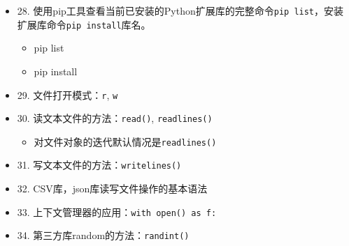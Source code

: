 \documentclass[11pt]{article}
\providecommand{\tightlist}{%
      \setlength{\itemsep}{0pt}\setlength{\parskip}{0pt}}
\newenvironment{Shaded}{}{}
\newcommand{\NormalTok}[1]{{#1}}
\begin{document}
    \begin{itemize}
\tightlist
\item
  28.
  使用pip工具查看当前已安装的Python扩展库的完整命令\texttt{pip\ list}，安装扩展库命令\texttt{pip\ install}库名。

  \begin{itemize}
  \item
    pip list

\begin{Shaded}
\end{Shaded}
  \item
    pip install

\begin{Shaded}
\end{Shaded}
  \end{itemize}
\end{itemize}

    \begin{itemize}
\tightlist
\item
  29. 文件打开模式：\texttt{r}, \texttt{w}
\item
  30. 读文本文件的方法：\texttt{read()}, \texttt{readlines()}

  \begin{itemize}
  \tightlist
  \item
    对文件对象的迭代默认情况是\texttt{readlines()}
  \end{itemize}
\item
  31. 写文本文件的方法：\texttt{writelines()}
\item
  32. CSV库，json库读写文件操作的基本语法
\item
  33. 上下文管理器的应用：\texttt{with\ open()\ as\ f:}
\end{itemize}

    \begin{itemize}
\tightlist
\item
  34. 第三方库random的方法：\texttt{randint()}
\end{itemize}
\end{document}
